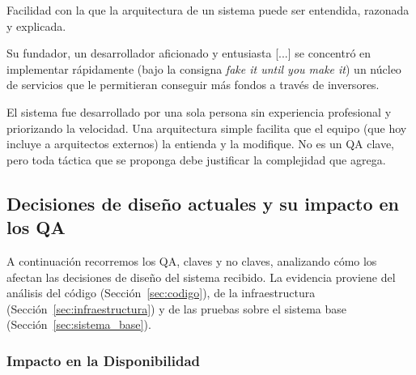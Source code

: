             Facilidad con la que la arquitectura de un sistema puede ser entendida, razonada y explicada.

            \begin{customenv}[frametitle=]
                Su fundador, un desarrollador aficionado y entusiasta [...] se concentró en implementar rápidamente (bajo la consigna \textit{fake it until you make it}) un núcleo de servicios que le permitieran conseguir más fondos a través de inversores.
            \end{customenv}

            El sistema fue desarrollado por una sola persona sin experiencia profesional
            y priorizando la velocidad. Una arquitectura simple facilita que el equipo
            (que hoy incluye a arquitectos externos) la entienda y la modifique. No es un
            QA clave, pero toda táctica que se proponga debe justificar la complejidad
            que agrega.

    \subsection{Decisiones de diseño actuales y su impacto en los QA}
    \label{sec:decisiones_impacto_qa}

        A continuación recorremos los QA, claves y no claves, analizando cómo los afectan
        las decisiones de diseño del sistema recibido. La evidencia proviene del análisis
        del código (Sección~\ref{sec:codigo}), de la infraestructura
        (Sección~\ref{sec:infraestructura}) y de las pruebas sobre el sistema base
        (Sección~\ref{sec:sistema_base}).

        \subsubsection{Impacto en la Disponibilidad}
        \label{sec:impacto_en_la_disponibilidad}

